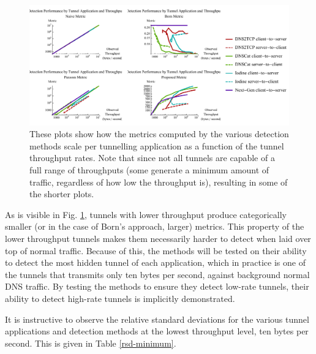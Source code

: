 \documentclass{llncs}
\begin{document}
\begin{figure}[h]
\centering
\includegraphics[width=\textwidth]{../figures/mpbtt.pdf}
\caption[Scaling of Detection Metrics by Tunnel Throughput]{These plots show how
the metrics computed by the various detection methods scale per tunnelling
application as a function of the tunnel throughput rates. Note that since not
all tunnels are capable of a full range of throughputs (some generate a minimum
amount of traffic, regardless of how low the throughput is), resulting in some
of the shorter plots.}
\label{mbtt}
\end{figure}

As is visible in Fig. \ref{mbtt}, tunnels with lower throughput produce
categorically smaller (or in the case of Born's approach, larger) metrics. This
property of the lower throughput tunnels makes them necessarily harder to detect
when laid over top of normal traffic. Because of this, the methods will be
tested on their ability to detect the most hidden tunnel of each application,
which in practice is one of the tunnels that transmits only ten bytes per
second, against background normal DNS traffic. By testing
the methods to ensure they detect low-rate tunnels, their ability to detect
high-rate tunnels is implicitly demonstrated.

It is instructive to observe the relative standard deviations for the various
tunnel applications and detection methods at the lowest throughput level, ten
bytes per second. This is given in Table \ref{rsd-minimum}.

\end{document}
